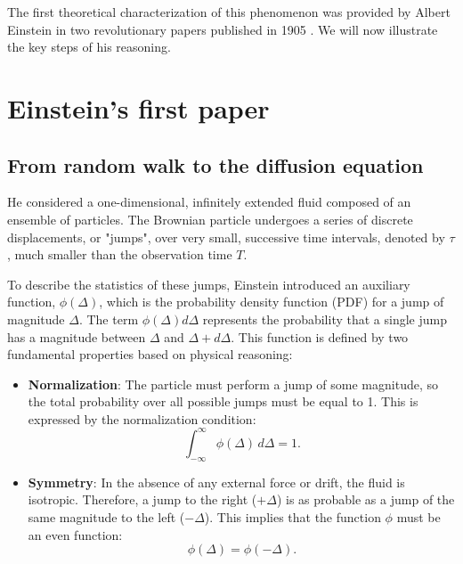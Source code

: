 The first theoretical characterization of this phenomenon was provided by Albert Einstein in two revolutionary papers published in 1905 \cite{Einstein1905, Einstein1906}. We will now illustrate the key steps of his reasoning.
\section{Einstein's first paper}
\subsection{From random walk to the diffusion equation}
He considered a one-dimensional, infinitely extended fluid composed of an ensemble of particles. The Brownian particle undergoes a series of discrete displacements, or "jumps", over very small, successive time intervals, denoted by $\tau$, much smaller than the observation time $T$.


\begin{center}
\end{center}

To describe the statistics of these jumps, Einstein introduced an auxiliary function, $\phi(\Delta)$, which is the probability density function (PDF) for a jump of magnitude $\Delta$. The term $\phi(\Delta)d\Delta$ represents the probability that a single jump has a magnitude between $\Delta$ and $\Delta+d\Delta$. This function is defined by two fundamental properties based on physical reasoning:
\begin{itemize}
    \item \textbf{Normalization}: The particle must perform a jump of some magnitude, so the total probability over all possible jumps must be equal to 1. This is expressed by the normalization condition:
    \[
    \int_{-\infty}^{\infty} \phi(\Delta) \,d\Delta = 1.
    \]
    \item \textbf{Symmetry}: In the absence of any external force or drift, the fluid is isotropic. Therefore, a jump to the right ($+\Delta$) is as probable as a jump of the same magnitude to the left ($-\Delta$). This implies that the function $\phi$ must be an even function:
    \[
    \phi(\Delta) = \phi(-\Delta).
    \]
\end{itemize}

